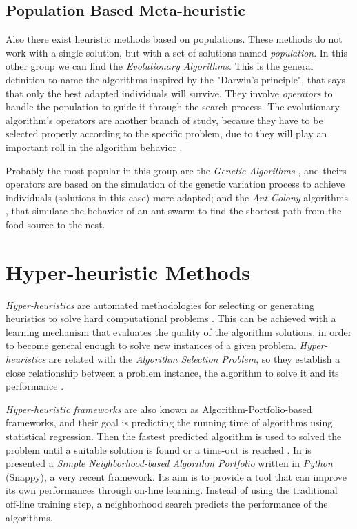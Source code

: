 \subsection{Population Based Meta-heuristic}

Also there exist heuristic methods based on populations. These methods do not work with a single solution, but with a set of solutions named {\it population}. In this other group we can find the {\it Evolutionary Algorithms}. This is the general definition to name the algorithms inspired by the "Darwin's principle", that says that only the best adapted individuals will survive. They involve {\it operators} to handle the population to guide it through the search process. The evolutionary algorithm's operators are another branch of study, because they have to be selected properly according to the specific problem, due to they will play an important roll in the algorithm behavior \cite{Maturana2012}. 

Probably the most popular in this group are the {\it Genetic Algorithms} \cite{Reeves2010}, and theirs operators are based on the simulation of the genetic variation  process to achieve individuals (solutions in this case) more adapted; and the {\it Ant Colony} algorithms \cite{Dorigo2010}, that simulate the behavior of an ant swarm to find the shortest path from the food source to the nest.

\section{Hyper-heuristic Methods}
\label{sec:hyper}

\textit{Hyper-heuristics} are automated methodologies for selecting or generating heuristics to solve hard computational problems \cite{Chakhlevitch2008}. This can be achieved with a learning mechanism that evaluates the quality of the algorithm solutions, in order to become general enough to solve new instances of a given problem. \textit{Hyper-heuristics} are related with the \textit{Algorithm Selection Problem}, so they establish a close relationship between a problem instance, the algorithm to solve it and its performance \cite{Ryser-welch}.   

\textit{Hyper-heuristic frameworks} are also known as Algorithm-Portfolio-based frameworks, and their goal is predicting the running time of algorithms using statistical regression. Then the fastest predicted algorithm is used to solved the problem until a suitable solution is found or a time-out is reached \cite{Leyton-Brown2003}. In \cite{Samulowitz2013} is presented a \textit{Simple Neighborhood-based Algorithm Portfolio} written in \textit{Python} (Snappy), a very recent framework. Its aim is to provide a tool that can improve its own performances through on-line learning. Instead of using the traditional off-line training step, a neighborhood search predicts the performance of the algorithms.

